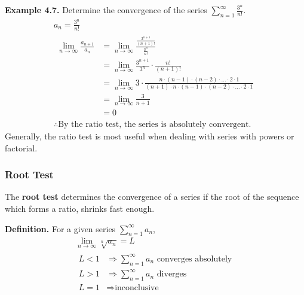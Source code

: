 \documentclass[12pt]{article}
\begin{document}
\textbf{Example 4.7.} Determine the convergence of the series $\displaystyle\sum_{n=1}^{\infty}\frac{3^n}{n!}$.
\begin{gather*}
	a_n = \frac{3^n}{n!}   \\
	\begin{aligned}
		\displaystyle\lim_{n\rightarrow\infty}\frac{a_{n+1}}{a_n} & = \displaystyle\lim_{n\rightarrow\infty}\frac{\frac{3^{n+1}}{(n+1)!}}{\frac{3^n}{n!}}                                                                    \\
		                                                          & = \displaystyle\lim_{n\rightarrow\infty}\frac{3^{n+1}}{3^n}\cdot\frac{n!}{(n+1)!}                                                                        \\
		                                                          & = \displaystyle\lim_{n\rightarrow\infty}3\cdot\frac{n\cdot(n-1)\cdot(n-2)\cdot\dots\cdot2\cdot1}{(n+1)\cdot n\cdot(n-1)\cdot(n-2)\cdot\dots\cdot2\cdot1} \\
		                                                          & = \displaystyle\lim_{n\rightarrow\infty}\frac{3}{n+1}                                                                                                    \\
		                                                          & = 0
	\end{aligned} \\
	\therefore \text{By the ratio test, the series is absolutely convergent.}
\end{gather*}
Generally, the ratio test is most useful when dealing with series with powers or factorial.

\subsubsection{Root Test}

The \textbf{root test} determines the convergence of a series if the root of the sequence which forms a ratio, shrinks fast enough.

\textbf{Definition.} For a given series $\displaystyle\sum_{n=1}^{\infty}a_n$,
\begin{gather*}
	\displaystyle\lim_{n\rightarrow\infty}\sqrt[n]{a_n} = L   \\
	\begin{aligned}
		L < 1 & \Rightarrow \displaystyle\sum_{n=1}^{\infty}a_n \text{ converges absolutely} \\
		L > 1 & \Rightarrow \displaystyle\sum_{n=1}^{\infty}a_n \text{ diverges}             \\
		L = 1 & \Rightarrow \text{inconclusive}                                              \\
	\end{aligned}
\end{gather*}
\end{document}
